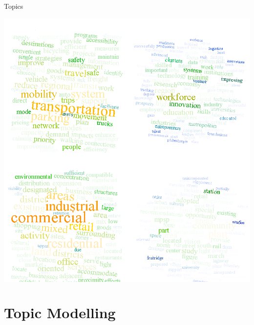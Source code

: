 \documentclass{lecture}
\begin{document}
\begin{plain}{Topics}
\vspace{-4ex}
\begin{center}
\includegraphics[scale=0.3]{figs/topic_visual}
\end{center}
\end{plain}

\section[Topic Models]{Topic Modelling}
\end{document}
